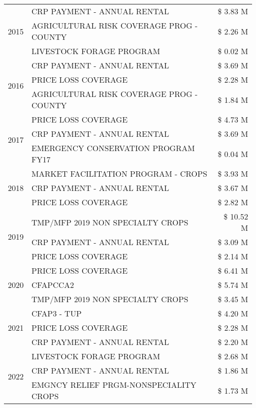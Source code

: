 \begin{tabular}{llr}
\cline{1-3}
\multirow[t]{3}{*}{2015} & CRP PAYMENT - ANNUAL RENTAL & \$ 3.83 M \\
 & AGRICULTURAL RISK COVERAGE PROG - COUNTY & \$ 2.26 M \\
 & LIVESTOCK FORAGE PROGRAM & \$ 0.02 M \\
\cline{1-3}
\multirow[t]{3}{*}{2016} & CRP PAYMENT - ANNUAL RENTAL & \$ 3.69 M \\
 & PRICE LOSS COVERAGE & \$ 2.28 M \\
 & AGRICULTURAL RISK COVERAGE PROG - COUNTY & \$ 1.84 M \\
\cline{1-3}
\multirow[t]{3}{*}{2017} & PRICE LOSS COVERAGE & \$ 4.73 M \\
 & CRP PAYMENT - ANNUAL RENTAL & \$ 3.69 M \\
 & EMERGENCY CONSERVATION PROGRAM FY17 & \$ 0.04 M \\
\cline{1-3}
\multirow[t]{3}{*}{2018} & MARKET FACILITATION PROGRAM - CROPS & \$ 3.93 M \\
 & CRP PAYMENT - ANNUAL RENTAL & \$ 3.67 M \\
 & PRICE LOSS COVERAGE & \$ 2.82 M \\
\cline{1-3}
\multirow[t]{3}{*}{2019} & TMP/MFP 2019 NON SPECIALTY CROPS & \$ 10.52 M \\
 & CRP PAYMENT - ANNUAL RENTAL & \$ 3.09 M \\
 & PRICE LOSS COVERAGE & \$ 2.14 M \\
\cline{1-3}
\multirow[t]{3}{*}{2020} & PRICE LOSS COVERAGE & \$ 6.41 M \\
 & CFAPCCA2 & \$ 5.74 M \\
 & TMP/MFP 2019 NON SPECIALTY CROPS & \$ 3.45 M \\
\cline{1-3}
\multirow[t]{3}{*}{2021} & CFAP3 - TUP & \$ 4.20 M \\
 & PRICE LOSS COVERAGE & \$ 2.28 M \\
 & CRP PAYMENT - ANNUAL RENTAL & \$ 2.20 M \\
\cline{1-3}
\multirow[t]{3}{*}{2022} & LIVESTOCK FORAGE PROGRAM & \$ 2.68 M \\
 & CRP PAYMENT - ANNUAL RENTAL & \$ 1.86 M \\
 & EMGNCY RELIEF PRGM-NONSPECIALITY CROPS & \$ 1.73 M \\
\cline{1-3}
\bottomrule
\end{tabular}

